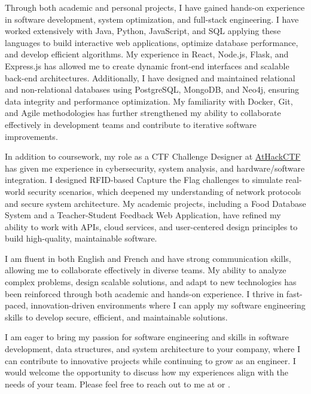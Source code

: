 \documentclass[10pt]{article}
\begin{document}

Through both academic and personal projects, I have gained hands-on experience in software development, system optimization, and full-stack engineering. I have worked extensively with Java, Python, JavaScript, and SQL applying these languages to build interactive web applications, optimize database performance, and develop efficient algorithms. My experience in React, Node.js, Flask, and Express.js has allowed me to create dynamic front-end interfaces and scalable back-end architectures. Additionally, I have designed and maintained relational and non-relational databases using PostgreSQL, MongoDB, and Neo4j, ensuring data integrity and performance optimization. My familiarity with Docker, Git, and Agile methodologies has further strengthened my ability to collaborate effectively in development teams and contribute to iterative software improvements.

In addition to coursework, my role as a CTF Challenge Designer at \href{https://athackctf.com}{AtHackCTF} has given me experience in cybersecurity, system analysis, and hardware/software integration. I designed RFID-based Capture the Flag challenges to simulate real-world security scenarios, which deepened my understanding of network protocols and secure system architecture. My academic projects, including a Food Database System and a Teacher-Student Feedback Web Application, have refined my ability to work with APIs, cloud services, and user-centered design principles to build high-quality, maintainable software.

I am fluent in both English and French and have strong communication skills, allowing me to collaborate effectively in diverse teams. My ability to analyze complex problems, design scalable solutions, and adapt to new technologies has been reinforced through both academic and hands-on experience. I thrive in fast-paced, innovation-driven environments where I can apply my software engineering skills to develop secure, efficient, and maintainable solutions.


I am eager to bring my passion for software engineering and skills in software development, data structures, and system architecture to your company, where I can contribute to innovative projects while continuing to grow as an engineer. I would welcome the opportunity to discuss how my experiences align with the needs of your team. Please feel free to reach out to me at \href{tel:+15149445977}{\phone} or \href{mailto:\email}{\email}.
\end{document}
